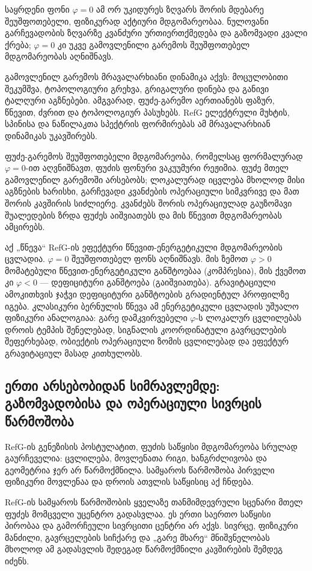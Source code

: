 \documentclass[11pt,a4paper]{article}
\begin{document}
საყრდენი ფონი $\varphi=0$ ამ ორ უკიდურეს ზღვარს შორის მდებარე შეუშფოთებელი, ფიზიკურად აქტიური მდგომარეობაა. ნულოვანი გარჩევადობის ზღვარზე კვანძური ურთიერთქმედება და გაზომვადი კვალი ქრება; $\varphi=0$ კი უკვე გამოვლენილი გარემოს შეუშფოთებელ მდგომარეობას აღნიშნავს.

გამოვლენილ გარემოს მრავალარხიანი დინამიკა აქვს: მოცულობითი შეკუმშვა, ტოპოლოგიური გრეხვა, გრიგალური დინება და განივი ტალღური აგზნებები. ამგვარად, ფუძე-გარემო აერთიანებს ფაზურ, წნევით, ძვრით და ტოპოლოგიურ პასუხებს. RefG ელექტრული მუხტის, სპინისა და ნაწილაკთა სპექტრის ფორმირებას ამ მრავალარხიან დინამიკას უკავშირებს.

ფუძე-გარემოს შეუშფოთებელი მდგომარეობა, რომელსაც ფორმალურად $\varphi=0$-ით აღვნიშნავთ, ფუძის ფონური ვაკუუმური რეჟიმია. ფუძე მთელ გამოვლენილ გარემოში არსებობს; ლოკალურად იცვლება მხოლოდ მისი აგზნების ხარისხი, გარჩევადი კვანძების ოპერაციული სიმკვრივე და მათ შორის კავშირის სიძლიერე. კვანძებს შორის ოპერაციულად გაუზომავი შუალედების ზრდა ფუძეს აიშვიათებს და მის წნევით მდგომარეობას ამცირებს.

აქ „წნევა“ RefG-ის ეფექტური წნევით-ენერგეტიკული მდგომარეობის ცვლადია. $\varphi=0$ შეუშფოთებელ ფონს აღნიშნავს. მის ზემოთ $\varphi>0$ მომატებული წნევით-ენერგეტიკული განშტოებაა (კომპრესია), მის ქვემოთ კი $\varphi<0$ — დეფიციტური განშტოება (გაიშვიათება). გრავიტაციული ამოკითხვის ჯაჭვი დეფიციტური განშტოების გრადიენტულ პროფილზე იგება. კლასიკური ბერნულის წნევა ამ ენერგეტიკული ცვლადის უშუალო ფიზიკური ანალოგიაა: გარე დამკვირვებელი $\varphi$-ს ლოკალურ ცვლილებას დროის ტემპის შენელებად, სიგნალის კოორდინატული გავრცელების შეფერხებად, ობიექტის ოპერაციული ზომის ცვლილებად და ეფექტურ გრავიტაციულ მასად კითხულობს.


\subsection{ერთი არსებობიდან სიმრავლემდე: გაზომვადობისა და ოპერაციული სივრცის წარმოშობა}

RefG-ის გენეზისის პოსტულატით, ფუძის საწყისი მდგომარეობა სრულად გაურჩეველია: ცვლილება, მოვლენათა რიგი, ხანგრძლივობა და გეომეტრია ჯერ არ წარმოქმნილა. სამყაროს წარმოშობა პირველი ფიზიკური მოვლენაა და დროის ათვლის საწყისიც აქ ჩნდება.

RefG-ის სამყაროს წარმოშობის ყველაზე თანმიმდევრული სცენარი მთელ ფუძეს მომცველი უცენტრო გადასვლაა. ეს ერთი საერთო საწყისი პირობაა და გამორჩეული სივრცითი ცენტრი არ აქვს. სივრცე, ფიზიკური მანძილი, გავრცელების სიჩქარე და „გარე მხარე“ მნიშვნელობას მხოლოდ ამ გადასვლის შედეგად წარმოქმნილი კავშირების შემდეგ იძენს.
\end{document}
